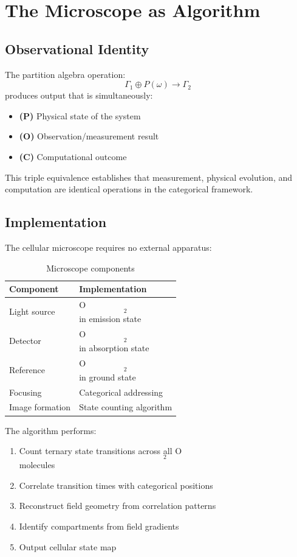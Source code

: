 \documentclass[twocolumn,10pt]{article}
\begin{document}
\section{The Microscope as Algorithm}

\subsection{Observational Identity}

The partition algebra operation:
\begin{equation}
\Gamma_1 \oplus P(\omega) \to \Gamma_2
\end{equation}
produces output that is simultaneously:
\begin{itemize}
\item \textbf{(P)} Physical state of the system
\item \textbf{(O)} Observation/measurement result
\item \textbf{(C)} Computational outcome
\end{itemize}

This triple equivalence establishes that measurement, physical evolution, and computation are identical operations in the categorical framework.

\subsection{Implementation}

The cellular microscope requires no external apparatus:

\begin{table}[H]
\centering
\caption{Microscope components}
\begin{tabular}{@{}ll@{}}
\toprule
Component & Implementation \\
\midrule
Light source & O$$_2$$ in emission state \\
Detector & O$$_2$$ in absorption state \\
Reference & O$$_2$$ in ground state \\
Focusing & Categorical addressing \\
Image formation & State counting algorithm \\
\bottomrule
\end{tabular}
\end{table}

The algorithm performs:
\begin{enumerate}
\item Count ternary state transitions across all O$$_2$$ molecules
\item Correlate transition times with categorical positions
\item Reconstruct field geometry from correlation patterns
\item Identify compartments from field gradients
\item Output cellular state map
\end{enumerate}
\end{document}
